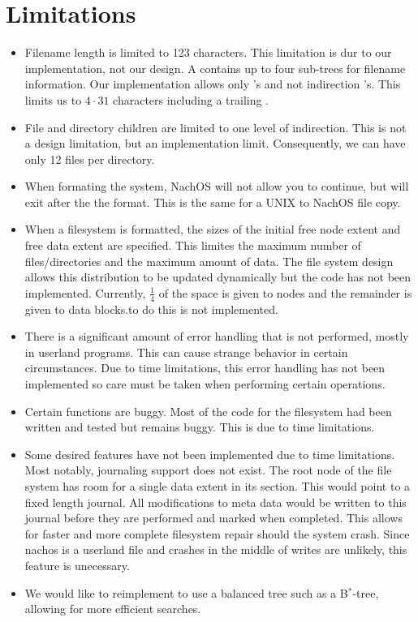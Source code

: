\section{Limitations}
\label{xref:limitationsFS}
  \begin{itemize}
    \item	Filename length is limited to 123 characters. This limitation
		is dur to our implementation, not our design. A 
		contains up to four sub-trees for filename information. Our implementation
		allows only 's and not indirection 's.
		This limits us to $4\cdot31$ characters including a trailing .
    \item	File and directory children are limited to one level of
		indirection.  This is not a design limitation, but an implementation limit.
		Consequently, we can have only 12 files per directory.
    \item	When formating the system, NachOS will not allow you to 
		continue, but will exit after the the format.  This is the
		same for a UNIX to NachOS file copy.
    \item	When a filesystem is formatted, the sizes of the initial free node extent
		and free data extent are specified. This limites the maximum number
		of files/directories and the maximum amount of data. The file system design
		allows this distribution to be updated dynamically but the code
		has not been implemented. Currently, $\frac{1}{4}$ of the space is given to nodes
		and the remainder is given to data blocks.to do this is not implemented.
    \item	There is a significant amount of error handling that is not performed, mostly in userland
    		programs. This can cause strange behavior in certain circumstances. Due to
		time limitations, this error handling has not been implemented so care must be
		taken when performing certain operations.
    \item	Certain functions are buggy. Most of the code for the filesystem had been written
    		and tested but remains buggy. This is due to time limitations.
    \item	Some desired features have not been implemented due to time limitations. Most notably,
    		journaling support does not exist. The root node of the file system has room for a single
		data extent in its  section. This would point to a fixed length journal. All
		modifications to meta data would be written to this journal before they are performed
		and marked when completed. This allows for faster and more complete filesystem repair
		should the system crash. Since nachos is a userland file and crashes in the middle of writes
		are unlikely, this feature is unecessary.
    \item	We would like to reimplement  to use a balanced tree such as a B$^*$-tree,
		allowing for more efficient searches.
  \end{itemize}
